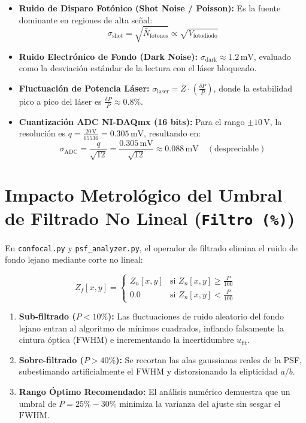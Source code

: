 \documentclass[11pt,a4paper]{article}
\begin{document}
\begin{itemize}[leftmargin=*]
    \item \textbf{Ruido de Disparo Fotónico (Shot Noise / Poisson):} Es la fuente dominante en regiones de alta señal:
    \begin{equation}
        \sigma_{\text{shot}} = \sqrt{\bar{N}_{\text{fotones}}} \propto \sqrt{V_{\text{fotodiodo}}}
    \end{equation}
    \item \textbf{Ruido Electrónico de Fondo (Dark Noise):} $\sigma_{\text{dark}} \approx 1.2\,\text{mV}$, evaluado como la desviación estándar de la lectura con el láser bloqueado.
    \item \textbf{Fluctuación de Potencia Láser:} $\sigma_{\text{laser}} = \bar{Z} \cdot \left(\frac{\delta P}{P}\right)$, donde la estabilidad pico a pico del láser es $\frac{\delta P}{P} \approx 0.8\%$.
    \item \textbf{Cuantización ADC NI-DAQmx (16 bits):} Para el rango $\pm 10\,\text{V}$, la resolución es $q = \frac{20\,\text{V}}{65536} = 0.305\,\text{mV}$, resultando en:
    \begin{equation}
        \sigma_{\text{ADC}} = \frac{q}{\sqrt{12}} = \frac{0.305\,\text{mV}}{\sqrt{12}} \approx 0.088\,\text{mV} \quad (\text{despreciable})
    \end{equation}
\end{itemize}

\section{Impacto Metrológico del Umbral de Filtrado No Lineal (\texttt{Filtro (\%)})}

En \texttt{confocal.py} y \texttt{psf_analyzer.py}, el operador de filtrado elimina el ruido de fondo lejano mediante corte no lineal:

\begin{equation}
    Z_f[x, y] = 
    \begin{cases} 
        Z_n[x, y] & \text{si } Z_n[x, y] \ge \frac{P}{100} \\[4pt]
        0.0 & \text{si } Z_n[x, y] < \frac{P}{100} 
    \end{cases}
\end{equation}

\begin{enumerate}[leftmargin=*]
    \item \textbf{Sub-filtrado ($P < 10\%$):} Las fluctuaciones de ruido aleatorio del fondo lejano entran al algoritmo de mínimos cuadrados, inflando falsamente la cintura óptica ($\text{FWHM}$) e incrementando la incertidumbre $u_{\text{fit}}$.
    \item \textbf{Sobre-filtrado ($P > 40\%$):} Se recortan las alas gaussianas reales de la PSF, subestimando artificialmente el $\text{FWHM}$ y distorsionando la elipticidad $a/b$.
    \item \textbf{Rango Óptimo Recomendado:} El análisis numérico demuestra que un umbral de \textbf{$P = 25\% - 30\%$} minimiza la varianza del ajuste sin sesgar el $\text{FWHM}$.
\end{enumerate}
\end{document}
